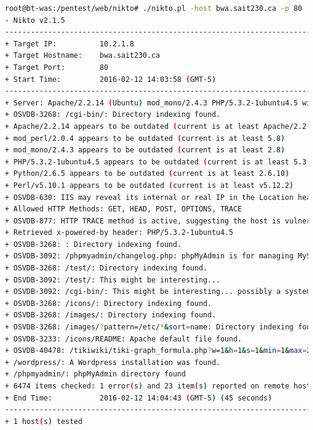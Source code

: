 \documentclass{article}
\begin{document}
\begin{lstlisting}[language=Bash]
root@bt-was:/pentest/web/nikto# ./nikto.pl -host bwa.sait230.ca -p 80
- Nikto v2.1.5
---------------------------------------------------------------------------
+ Target IP:          10.2.1.8
+ Target Hostname:    bwa.sait230.ca
+ Target Port:        80
+ Start Time:         2016-02-12 14:03:58 (GMT-5)
---------------------------------------------------------------------------
+ Server: Apache/2.2.14 (Ubuntu) mod_mono/2.4.3 PHP/5.3.2-1ubuntu4.5 with Suhosin-Patch mod_python/3.3.1 Python/2.6.5 mod_perl/2.0.4 Perl/v5.10.1
+ OSVDB-3268: /cgi-bin/: Directory indexing found.
+ Apache/2.2.14 appears to be outdated (current is at least Apache/2.2.19). Apache 1.3.42 (final release) and 2.0.64 are also current.
+ mod_perl/2.0.4 appears to be outdated (current is at least 5.8)
+ mod_mono/2.4.3 appears to be outdated (current is at least 2.8)
+ PHP/5.3.2-1ubuntu4.5 appears to be outdated (current is at least 5.3.6)
+ Python/2.6.5 appears to be outdated (current is at least 2.6.10)
+ Perl/v5.10.1 appears to be outdated (current is at least v5.12.2)
+ OSVDB-630: IIS may reveal its internal or real IP in the Location header via a request to the /images directory. The value is "http://127.0.0.1/images/".
+ Allowed HTTP Methods: GET, HEAD, POST, OPTIONS, TRACE 
+ OSVDB-877: HTTP TRACE method is active, suggesting the host is vulnerable to XST
+ Retrieved x-powered-by header: PHP/5.3.2-1ubuntu4.5
+ OSVDB-3268: : Directory indexing found.
+ OSVDB-3092: /phpmyadmin/changelog.php: phpMyAdmin is for managing MySQL databases, and should be protected or limited to authorized hosts.
+ OSVDB-3268: /test/: Directory indexing found.
+ OSVDB-3092: /test/: This might be interesting...
+ OSVDB-3092: /cgi-bin/: This might be interesting... possibly a system shell found.
+ OSVDB-3268: /icons/: Directory indexing found.
+ OSVDB-3268: /images/: Directory indexing found.
+ OSVDB-3268: /images/?pattern=/etc/*&sort=name: Directory indexing found.
+ OSVDB-3233: /icons/README: Apache default file found.
+ OSVDB-40478: /tikiwiki/tiki-graph_formula.php?w=1&h=1&s=1&min=1&max=2&f[]=x.tan.phpinfo()&t=png&title=http://cirt.net/rfiinc.txt?: TikiWiki contains a vulnerability which allows remote attackers to execute arbitrary PHP code.
+ /wordpress/: A Wordpress installation was found.
+ /phpmyadmin/: phpMyAdmin directory found
+ 6474 items checked: 1 error(s) and 23 item(s) reported on remote host
+ End Time:           2016-02-12 14:04:43 (GMT-5) (45 seconds)
---------------------------------------------------------------------------
+ 1 host(s) tested
\end{lstlisting}
\end{document}
